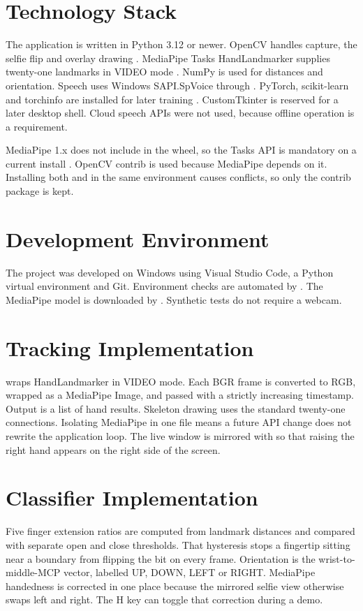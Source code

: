 \section{Technology Stack}
The application is written in Python 3.12 or newer. OpenCV handles capture, the selfie flip and overlay drawing \cite{opencv}. MediaPipe Tasks HandLandmarker supplies twenty-one landmarks in VIDEO mode \cite{mediapipehl,mediapipehands}. NumPy is used for distances and orientation. Speech uses Windows SAPI.SpVoice through  \cite{sapi}. PyTorch, scikit-learn and torchinfo are installed for later training \cite{pytorch}. CustomTkinter is reserved for a later desktop shell. Cloud speech APIs were not used, because offline operation is a requirement.

MediaPipe 1.x does not include  in the wheel, so the Tasks API is mandatory on a current install \cite{mediapipehl}. OpenCV contrib is used because MediaPipe depends on it. Installing both  and  in the same environment causes conflicts, so only the contrib package is kept.

\section{Development Environment}
The project was developed on Windows using Visual Studio Code, a Python virtual environment and Git. Environment checks are automated by . The MediaPipe model is downloaded by . Synthetic tests do not require a webcam.

\section{Tracking Implementation}
 wraps HandLandmarker in VIDEO mode. Each BGR frame is converted to RGB, wrapped as a MediaPipe Image, and passed with a strictly increasing timestamp. Output is a list of hand results. Skeleton drawing uses the standard twenty-one connections. Isolating MediaPipe in one file means a future API change does not rewrite the application loop. The live window is mirrored with  so that raising the right hand appears on the right side of the screen.

\section{Classifier Implementation}
Five finger extension ratios are computed from landmark distances and compared with separate open and close thresholds. That hysteresis stops a fingertip sitting near a boundary from flipping the bit on every frame. Orientation is the wrist-to-middle-MCP vector, labelled UP, DOWN, LEFT or RIGHT. MediaPipe handedness is corrected in one place because the mirrored selfie view otherwise swaps left and right. The H key can toggle that correction during a demo.

